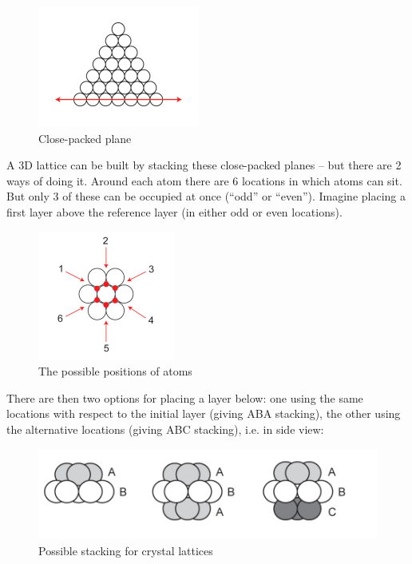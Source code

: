 \documentclass{article}
\begin{document}
\begin{figure}[h]
    \centering
    \includegraphics{images/mat1.png}
    \caption{Close-packed plane}
    \label{fig:enter-label}
\end{figure}

A 3D lattice can be built by stacking these close-packed planes – but there are 2 ways of doing it.
Around each atom there are 6 locations in which atoms can sit.
But only 3 of these can be occupied at once (“odd” or “even”).
Imagine placing a first layer above the reference layer (in either odd
or even locations). 

\begin{figure}[h]
    \centering
    \includegraphics{images/mat2.png}
    \caption{The possible positions of atoms}
    \label{fig:enter-label}
\end{figure}

There are then two options for placing a layer
below: one using the same locations with respect to the initial layer
(giving ABA stacking), the other using the alternative locations
(giving ABC stacking), i.e. in side view:

\begin{figure}[h]
    \centering
    \includegraphics{images/mat3.png}
    \caption{Possible stacking for crystal lattices}
    \label{fig:enter-label}
\end{figure}
\end{document}
